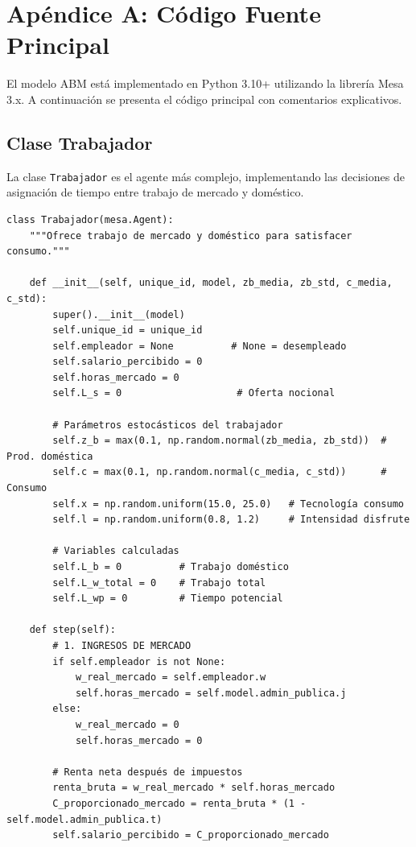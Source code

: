 \section{Apéndice A: Código Fuente Principal}

El modelo ABM está implementado en Python 3.10+ utilizando la librería Mesa 3.x. A continuación se presenta el código principal con comentarios explicativos.

\subsection{Clase Trabajador}

La clase \texttt{Trabajador} es el agente más complejo, implementando las decisiones de asignación de tiempo entre trabajo de mercado y doméstico.

\begin{verbatim}
class Trabajador(mesa.Agent):
    """Ofrece trabajo de mercado y doméstico para satisfacer consumo."""
    
    def __init__(self, unique_id, model, zb_media, zb_std, c_media, c_std):
        super().__init__(model)
        self.unique_id = unique_id
        self.empleador = None          # None = desempleado
        self.salario_percibido = 0
        self.horas_mercado = 0 
        self.L_s = 0                    # Oferta nocional
        
        # Parámetros estocásticos del trabajador
        self.z_b = max(0.1, np.random.normal(zb_media, zb_std))  # Prod. doméstica
        self.c = max(0.1, np.random.normal(c_media, c_std))      # Consumo
        self.x = np.random.uniform(15.0, 25.0)   # Tecnología consumo
        self.l = np.random.uniform(0.8, 1.2)     # Intensidad disfrute
        
        # Variables calculadas
        self.L_b = 0          # Trabajo doméstico
        self.L_w_total = 0    # Trabajo total
        self.L_wp = 0         # Tiempo potencial

    def step(self):
        # 1. INGRESOS DE MERCADO
        if self.empleador is not None:
            w_real_mercado = self.empleador.w
            self.horas_mercado = self.model.admin_publica.j
        else:
            w_real_mercado = 0
            self.horas_mercado = 0
        
        # Renta neta después de impuestos
        renta_bruta = w_real_mercado * self.horas_mercado
        C_proporcionado_mercado = renta_bruta * (1 - self.model.admin_publica.t)
        self.salario_percibido = C_proporcionado_mercado
            

\end{verbatim}
